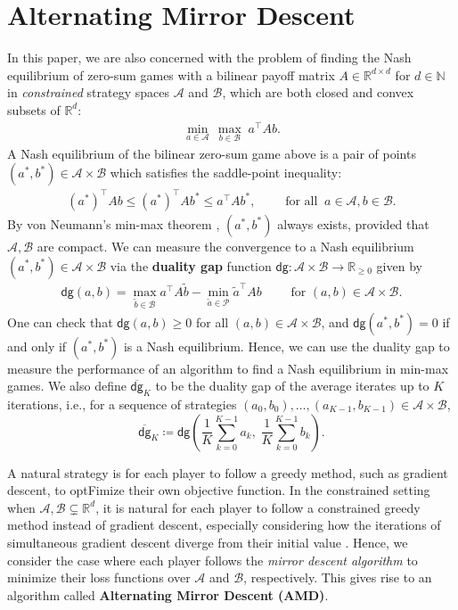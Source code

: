\documentclass[11pt]{article}
\newcommand{\R}{\mathbb{R}}
\newcommand{\N}{\mathbb{N}}
\newcommand{\A}{\mathcal{A}}
\newcommand{\B}{\mathcal{B}}
\newcommand{\dg}{\textsf{dg}}
\begin{document}
\section{Alternating Mirror Descent}\label{Section_Settings}

In this paper, we are also concerned with the problem of finding the Nash equilibrium of zero-sum games with a bilinear payoff matrix $A \in \R^{d\times d}$ for $d \in \N$ in \textit{constrained} strategy spaces $\mathcal{A}$ and $\mathcal{B}$, which are both closed and convex subsets of $\R^{d}$: 
\begin{gather}
    \min_{a\in\mathcal{A}} \,{\max_{b\in\mathcal{B}} \; a^{\top}Ab} \label{ineqq}.
\end{gather}
A Nash equilibrium of the bilinear zero-sum game above is a pair of points $\left(a^{*},b^{*}\right)\in\A\times\B$ which satisfies the saddle-point inequality:
\begin{gather}
    \left(a^{*}\right)^{\top}Ab\leq \left(a^{*}\right)^{\top}Ab^{*}\leq a^{\top}Ab^{*}, \qquad \text{ for all } ~ a \in \mathcal{A}, b \in \mathcal{B}.\label{ineq}
\end{gather}
By von Neumann's min-max theorem \citep{vNeumann1928min-max}, $\left(a^{*},b^{*}\right)$ always exists, provided that $\mathcal{A},\mathcal{B}$ are compact. 
We can measure the convergence to a Nash equilibrium $\left(a^{*},b^{*}\right)\in\mathcal{A}\times\mathcal{B}$ via the \textbf{duality gap} function $\dg:\mathcal{A}\times\mathcal{B}\rightarrow\R_{\geq 0}$ given by 
\begin{gather}
    \dg\left(a,b\right)=\max_{\widetilde{b}\in\mathcal{B}}{a^{\top}A\widetilde{b}}-\min_{\widetilde{a}\in\mathcal{P}}{\widetilde{a}^{\top}Ab}\qquad \text{ for }\left(a,b\right)\in\mathcal{A}\times\mathcal{B}.
\end{gather}
One can check that $\dg\left(a,b\right) \ge 0$ for all $(a,b) \in \A \times \B$, and $\dg\left(a^*,b^*\right)=0$ if and only if $\left(a^{*},b^{*}\right)$ is a Nash equilibrium. 
Hence, we can use the duality gap to measure the performance of an algorithm to find a Nash equilibrium in min-max games. 
We also define $\overline{\dg}_{K}$ to be the duality gap of the average iterates up to $K$ iterations, i.e., for a sequence of strategies $(a_0,b_0), \dots, (a_{K-1}, b_{K-1}) \in \A \times \B$, 
$$\overline{\dg}_{K}\coloneqq \dg\left(\frac{1}{K}\sum_{k=0}^{K-1}{a_{k}}, \; \frac{1}{K}\sum_{k=0}^{K-1}{b_{k}}\right).$$  

A natural strategy is for each player to follow a greedy method, such as gradient descent, to optFimize their own objective function.
In the constrained setting when $\mathcal{A},\mathcal{B}\subsetneq\R^{d}$, it is natural for each player to follow a constrained greedy method instead of gradient descent, especially considering how the iterations of simultaneous gradient descent diverge from their initial value \citep{gidel2019diverge}. Hence, we consider the case where each player follows the \textit{mirror descent algorithm} \citep{Nemirovsky1983-vo} to minimize their loss functions over $\mathcal{A}$ and $\mathcal{B}$, respectively. This gives rise to an algorithm called \textbf{Alternating Mirror Descent (AMD)}. 
\end{document}
